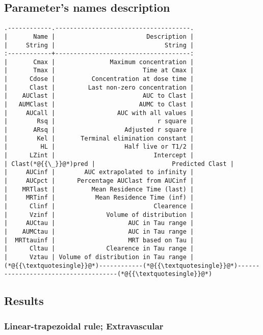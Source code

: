 \documentclass[12pt,a4paper]{article}
\begin{document}
\subsection{Parameter's names description}

\begin{lstlisting}
.------------.-------------------------------------.
|       Name |                         Description |
|     String |                              String |
:------------+-------------------------------------:
|       Cmax |               Maximum concentration |
|       Tmax |                        Time at Cmax |
|      Cdose |          Concentration at dose time |
|      Clast |         Last non-zero concentration |
|    AUClast |                        AUC to Clast |
|   AUMClast |                       AUMC to Clast |
|     AUCall |                 AUC with all values |
|        Rsq |                            r square |
|       ARsq |                   Adjusted r square |
|        Kel |       Terminal elimination constant |
|         HL |                   Half live or T1/2 |
|      LZint |                           Intercept |
| Clast(*@{{\_}}@*)pred |                     Predicted Clast |
|     AUCinf |        AUC extrapolated to infinity |
|     AUCpct |      Percentage AUClast from AUCinf |
|    MRTlast |          Mean Residence Time (last) |
|     MRTinf |           Mean Residence Time (inf) |
|      Clinf |                           Clearence |
|      Vzinf |              Volume of distribution |
|     AUCtau |                    AUC in Tau range |
|    AUMCtau |                    AUC in Tau range |
|  MRTtauinf |                    MRT based on Tau |
|      Cltau |              Clearence in Tau range |
|      Vztau | Volume of distribution in Tau range |
(*@{{\textquotesingle}}@*)------------(*@{{\textquotesingle}}@*)-------------------------------------(*@{{\textquotesingle}}@*)
\end{lstlisting}


\subsection{Results}
\subsubsection{Linear-trapezoidal rule; Extravascular}
\end{document}
